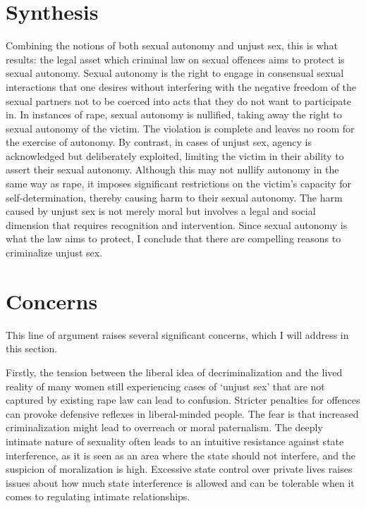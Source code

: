 \section*{Synthesis}
Combining the notions of both sexual autonomy and unjust sex, this is
what results: the legal asset which criminal law on sexual offences aims
to protect is sexual autonomy. Sexual autonomy is the right to engage in
consensual sexual interactions that one desires without interfering with
the negative freedom of the sexual partners not to be coerced into acts
that they do not want to participate in. In instances of rape, sexual
autonomy is nullified, taking away the right to sexual autonomy of the
victim. The violation is complete and leaves no room for the exercise of
autonomy. By contrast, in cases of unjust sex, agency is acknowledged
but deliberately exploited, limiting the victim in their ability to
assert their sexual autonomy. Although this may not nullify autonomy in
the same way as rape, it imposes significant restrictions on the
victim's capacity for self-determination, thereby causing harm to their
sexual autonomy. The harm caused by unjust sex is not merely moral but
involves a legal and social dimension that requires recognition and
intervention. Since sexual autonomy is what the law aims to protect, I
conclude that there are compelling reasons to criminalize unjust sex.

\section*{Concerns}
This line of argument raises several significant concerns, which I will
address in this section.

Firstly, the tension between the liberal idea of decriminalization and
the lived reality of many women still experiencing cases of `unjust sex'
that are not captured by existing rape law can lead to confusion.
Stricter penalties for offences can provoke defensive reflexes in
liberal-minded people. The fear is that increased criminalization might
lead to overreach or moral paternalism. The deeply intimate nature of
sexuality often leads to an intuitive resistance against state
interference, as it is seen as an area where the state should not
interfere, and the suspicion of moralization is high. Excessive state
control over private lives raises issues about how much state
interference is allowed and can be tolerable when it comes to regulating
intimate relationships.

